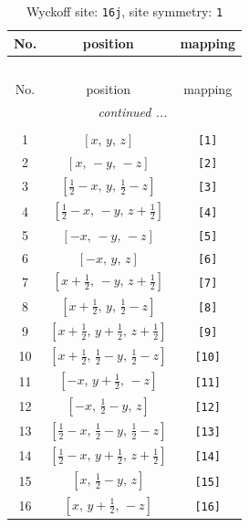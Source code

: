 \documentclass[fleqn,8pt]{jsarticle}
\begin{document}
\begin{longtable}{ccc}
\caption{Wyckoff site: {\tt 16j}, site symmetry: {\tt 1}}
 \\
 \hline \hline
No. & position & mapping \\ \hline \endfirsthead

\multicolumn{2}{l}{\tablename\ \thetable{}} \\
 \hline \hline
No. & position & mapping \\ \hline \endhead

 \hline \hline
\multicolumn{2}{r}{\footnotesize\it continued ...} \\ \endfoot

 \hline \hline
\multicolumn{2}{r}{} \\ \endlastfoot

1 & $\left[ x,\, y,\, z \right]$ & {\tt [1]} \\ \hline
2 & $\left[ x,\, - y,\, - z \right]$ & {\tt [2]} \\ \hline
3 & $\left[ \frac{1}{2} - x,\, y,\, \frac{1}{2} - z \right]$ & {\tt [3]} \\ \hline
4 & $\left[ \frac{1}{2} - x,\, - y,\, z + \frac{1}{2} \right]$ & {\tt [4]} \\ \hline
5 & $\left[ - x,\, - y,\, - z \right]$ & {\tt [5]} \\ \hline
6 & $\left[ - x,\, y,\, z \right]$ & {\tt [6]} \\ \hline
7 & $\left[ x + \frac{1}{2},\, - y,\, z + \frac{1}{2} \right]$ & {\tt [7]} \\ \hline
8 & $\left[ x + \frac{1}{2},\, y,\, \frac{1}{2} - z \right]$ & {\tt [8]} \\ \hline
9 & $\left[ x + \frac{1}{2},\, y + \frac{1}{2},\, z + \frac{1}{2} \right]$ & {\tt [9]} \\ \hline
10 & $\left[ x + \frac{1}{2},\, \frac{1}{2} - y,\, \frac{1}{2} - z \right]$ & {\tt [10]} \\ \hline
11 & $\left[ - x,\, y + \frac{1}{2},\, - z \right]$ & {\tt [11]} \\ \hline
12 & $\left[ - x,\, \frac{1}{2} - y,\, z \right]$ & {\tt [12]} \\ \hline
13 & $\left[ \frac{1}{2} - x,\, \frac{1}{2} - y,\, \frac{1}{2} - z \right]$ & {\tt [13]} \\ \hline
14 & $\left[ \frac{1}{2} - x,\, y + \frac{1}{2},\, z + \frac{1}{2} \right]$ & {\tt [14]} \\ \hline
15 & $\left[ x,\, \frac{1}{2} - y,\, z \right]$ & {\tt [15]} \\ \hline
16 & $\left[ x,\, y + \frac{1}{2},\, - z \right]$ & {\tt [16]} \\
\end{longtable}
\end{document}

